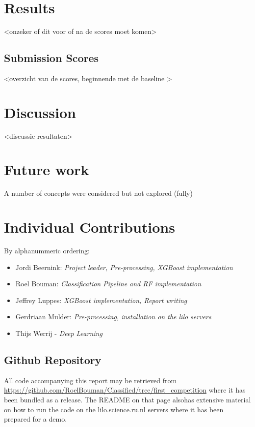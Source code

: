 \documentclass[runningheads,a4paper]{llncs}
\begin{document}
\section{Results}
<onzeker of dit voor of na de scores moet komen>
\subsection{Submission Scores}
<overzicht van de scores, beginnende met de baseline >
\section{Discussion}
<discussie resultaten>
\section{Future work}
A number of concepts were considered but not explored (fully) 


\section{Individual Contributions}
By alphanummeric ordering:
\begin{itemize}
\item Jordi Beernink: \textit{Project leader, Pre-processing, XGBoost implementation}
\item Roel Bouman: \textit{Classification Pipeline and RF implementation}
\item Jeffrey Luppes: \textit{XGBoost implementation, Report writing}
\item Gerdriaan Mulder: \textit{Pre-processing, installation on the lilo servers}
\item Thijs Werrij - \textit{Deep Learning}
\end{itemize}
\subsection{Github Repository}
All code accompanying this report may be retrieved from \url{https://github.com/RoelBouman/Classified/tree/first_competition} where it has been bundled as a release. The README on that page alsohas extensive material on how to run the code on the lilo.science.ru.nl servers where it has been prepared for a demo. 
\medskip

\nocite{*} 
\end{document}
